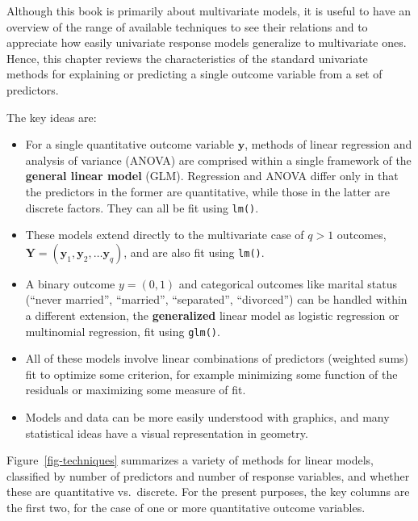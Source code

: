 \documentclass[
  letterpaper,
  10pt,
  krantz2]{krantz}
\begin{document}
Although this book is primarily about multivariate models, it is useful
to have an overview of the range of available techniques to see their
relations and to appreciate how easily univariate response models
generalize to multivariate ones. Hence, this chapter reviews the
characteristics of the standard univariate methods for explaining or
predicting a single outcome variable from a set of predictors.

The key ideas are:

\begin{itemize}
\item
  For a single quantitative outcome variable \(\mathbf{y}\), methods of
  linear regression and analysis of variance (ANOVA) are comprised
  within a single framework of the \textbf{general linear model} (GLM).
  Regression and ANOVA differ only in that the predictors in the former
  are quantitative, while those in the latter are discrete factors. They
  can all be fit using \texttt{lm()}.
\item
  These models extend directly to the multivariate case of \(q > 1\)
  outcomes,
  \(\mathbf{Y} = (\mathbf{y}_1, \mathbf{y}_2, \dots \mathbf{y}_q)\), and
  are also fit using \texttt{lm()}.
\item
  A binary outcome \(y = (0, 1)\) and categorical outcomes like marital
  status (``never married'', ``married'', ``separated'', ``divorced'')
  can be handled within a different extension, the \textbf{generalized}
  linear model as logistic regression or multinomial regression, fit
  using \texttt{glm()}.
\item
  All of these models involve linear combinations of predictors
  (weighted sums) fit to optimize some criterion, for example minimizing
  some function of the residuals or maximizing some measure of fit.
\item
  Models and data can be more easily understood with graphics, and many
  statistical ideas have a visual representation in geometry.
\end{itemize}

Figure~\ref{fig-techniques} summarizes a variety of methods for linear
models, classified by number of predictors and number of response
variables, and whether these are quantitative vs.~discrete. For the
present purposes, the key columns are the first two, for the case of one
or more quantitative outcome variables.
\end{document}
